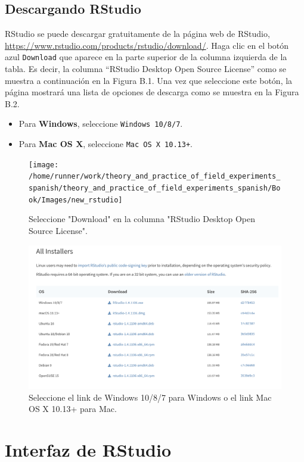 \documentclass[12pt,spanish,]{book}
\providecommand{\tightlist}{%
  \setlength{\itemsep}{0pt}\setlength{\parskip}{0pt}}
\begin{document}
\hypertarget{descargando-rstudio}{%
\subsection{Descargando RStudio}\label{descargando-rstudio}}

RStudio se puede descargar gratuitamente de la página web de RStudio, \url{https://www.rstudio.com/products/rstudio/download/}. Haga clic en el botón azul \texttt{Download} que aparece en la parte superior de la columna izquierda de la tabla. Es decir, la columna ``RStudio Desktop Open Source License'' como se muestra a continuación en la Figura B.1. Una vez que seleccione este botón, la página mostrará una lista de opciones de descarga como se muestra en la Figura B.2.

\begin{itemize}
\tightlist
\item
  Para \textbf{Windows}, seleccione \texttt{Windows\ 10/8/7}.
\item
  Para \textbf{Mac OS X}, seleccione \texttt{Mac\ OS\ X\ 10.13+}.
\end{itemize}

\begin{figure}
\texttt{[image: /home/runner/work/theory\_and\_practice\_of\_field\_experiments\_spanish/theory\_and\_practice\_of\_field\_experiments\_spanish/Book/Images/new\_rstudio]} \caption{Seleccione "Download" en la columna "RStudio Desktop Open Source License".}\label{fig:rstudiopng}
\end{figure}

\begin{figure}
\includegraphics[width=0.8\linewidth]{Images/rstudio_download} \caption{Seleccione el link de Windows 10/8/7 para Windows o el link Mac OS X 10.13+ para Mac.}\label{fig:rstudiodownload}
\end{figure}

\hypertarget{interfaz-de-rstudio}{%
\section{Interfaz de RStudio}\label{interfaz-de-rstudio}}
\end{document}

